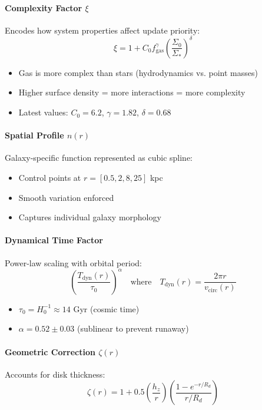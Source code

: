 \documentclass[12pt,letterpaper]{article}
\newcommand{\tdyn}{T_{\text{dyn}}}
\begin{document}
\paragraph{Complexity Factor $\xi$}
Encodes how system properties affect update priority:
\begin{equation}
\xi = 1 + C_0 f_{\text{gas}}^\gamma \left(\frac{\Sigma_0}{\Sigma_*}\right)^\delta
\end{equation}
\begin{itemize}
    \item Gas is more complex than stars (hydrodynamics vs. point masses)
    \item Higher surface density = more interactions = more complexity
    \item Latest values: $C_0 = 6.2$, $\gamma = 1.82$, $\delta = 0.68$
\end{itemize}

\paragraph{Spatial Profile $n(r)$}
Galaxy-specific function represented as cubic spline:
\begin{itemize}
    \item Control points at $r = [0.5, 2, 8, 25]$ kpc
    \item Smooth variation enforced
    \item Captures individual galaxy morphology
\end{itemize}

\paragraph{Dynamical Time Factor}
Power-law scaling with orbital period:
\begin{equation}
\left(\frac{\tdyn(r)}{\tau_0}\right)^\alpha \quad \text{where} \quad \tdyn(r) = \frac{2\pi r}{v_{\text{circ}}(r)}
\end{equation}
\begin{itemize}
    \item $\tau_0 = H_0^{-1} \approx 14$ Gyr (cosmic time)
    \item $\alpha = 0.52 \pm 0.03$ (sublinear to prevent runaway)
\end{itemize}

\paragraph{Geometric Correction $\zeta(r)$}
Accounts for disk thickness:
\begin{equation}
\zeta(r) = 1 + 0.5\left(\frac{h_z}{r}\right)\left(\frac{1-e^{-r/R_d}}{r/R_d}\right)
\end{equation}
\end{document}
